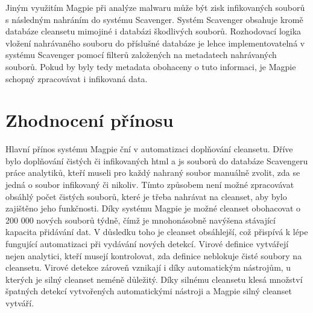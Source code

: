 \documentclass[thesis=M,czech,hidelinks]{FITthesis}[2013/05/06]
\begin{document}
Jiným využitím Magpie při analýze malwaru může být zisk infikovaných souborů s následným nahráním do systému Scavenger. Systém Scavenger obsahuje kromě databáze cleansetu mimojiné i databázi škodlivých souborů. Rozhodovací logika vložení nahrávaného souboru do příslušné databáze je lehce implementovatelná v systému Scavenger pomocí filterů založených na metadatech nahrávaných souborů. Pokud by byly tedy metadata obohaceny o tuto informaci, je Magpie schopný zpracovávat i infikovaná data.



\section{Zhodnocení přínosu}
Hlavní přínos systému Magpie ční v automatizaci doplňování cleansetu. Dříve bylo doplňování čistých či infikovaných html a js souborů do databáze Scavengeru práce analytiků, kteří museli pro každý nahraný soubor manuálně zvolit, zda se jedná o soubor infikovaný či nikoliv. Tímto způsobem není možné zpracovávat obsáhlý počet čistých souborů, které je třeba nahrávat na cleanset, aby bylo zajištěno jeho funkčnosti. Díky systému Magpie je možné cleanset obohacovat o 200 000 nových souborů týdně, čímž je mnohonásobně navýšena stávající kapacita přidávání dat. V důsledku toho je cleanset obsáhlejší, což přispívá k lépe fungující automatizaci při vydávání nových detekcí. Virové definice vytvářejí nejen analytici, kteří musejí kontrolovat, zda definice neblokuje čisté soubory na cleansetu. Virové detekce zároveň vznikají i díky automatickým nástrojům, u kterých je silný cleanset neméně důležitý. Díky silnému cleansetu klesá množství špatných detekcí vytvořených automatickými nástroji a Magpie silný cleanset vytváří.









 \setlength{\parskip}{10pt}
\end{document}
